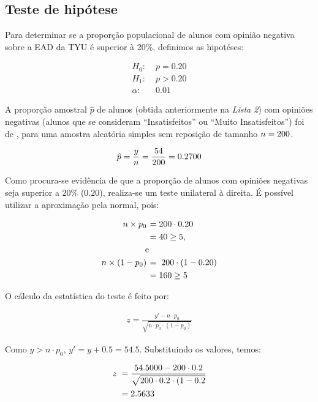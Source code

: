
\subsection{Teste de hipótese}
\label{questao:4a}
	Para determinar se a proporção populacional de alunos com opinião negativa
	sobre a EAD da TYU é superior à 20\%, definimos as hipotéses:

	\begin{align*} 
		H_0\!:   &\; p = 0.20 \\
		H_1\!:   &\; p > 0.20  \\
		\alpha\!:&\; 0.01
	\end{align*}

	A proporção amostral $\hat{p}$ de alunos (obtida anteriormente na \textit{Lista 2}) com opiniões
	negativas (alunos que se consideram ``Insatisfeitos'' ou ``Muito Insatisfeitos'')
	foi de \QUATROpAmostral, para uma amostra aleatória simples sem reposição de tamanho $n = 200$.

	\begin{align*} 
		\hat{p}  = \frac{y}{n} = {\frac{\num{54.0000}}{200}} = \num{0.2700}
	\end{align*}
	
	Como procura-se evidência de que a proporção de alunos com opiniões negativas seja superior
	a $20\%$ ($0.20$), realiza-se um teste unilateral à direita.
	É possível utilizar a aproximação pela normal, pois:

	\begin{align*}
	  n \times p_0\!  &\; = 200 \cdot 0.20 \\
	  &\; = 40 \geq 5 ,\\
	  & \text{e} \\
	  n \times (1 - p_0)\!	&\;=\; 200 \cdot (1 - 0.20) \\
	  &\;= 160  \geq 5 \\
	\end{align*}

	O cálculo da estatística do teste é feito por:

	\begin{align*}
		z = \frac{y' - n \cdot p_0}{\sqrt{n \cdot p_0 \cdot (1 - p_0)}}
	\end{align*}

	Como $y > n \cdot p_0$, $y' = y + 0.5 = 54.5$. Substituindo os valores, temos:

	\begin{align*}
		z &\; = \frac{\num{54.5000} - 200 \cdot 0.2}{\sqrt{200 \cdot 0.2 \cdot (1 - 0.2}}\\
		&\; = \num{2.5633}
	\end{align*}

